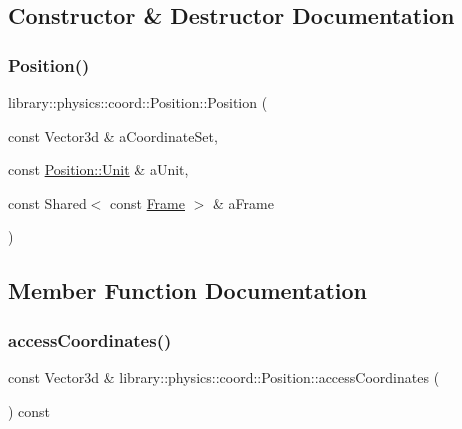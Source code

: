 \subsection{Constructor \& Destructor Documentation}
\mbox{\label{classlibrary_1_1physics_1_1coord_1_1_position_a68bead4a5057939ee5b6e77d2a8aa446}} 
\subsubsection{\texorpdfstring{Position()}{Position()}}
{\footnotesize\ttfamily library\+::physics\+::coord\+::\+Position\+::\+Position (\begin{DoxyParamCaption}\item[{const Vector3d \&}]{a\+Coordinate\+Set,  }\item[{const \hyperlink{classlibrary_1_1physics_1_1units_1_1_length_a3b8b39cd245cf6b19dc34459baeccb18}{Position\+::\+Unit} \&}]{a\+Unit,  }\item[{const Shared$<$ const \hyperlink{classlibrary_1_1physics_1_1coord_1_1_frame}{Frame} $>$ \&}]{a\+Frame }\end{DoxyParamCaption})}



\subsection{Member Function Documentation}
\mbox{\label{classlibrary_1_1physics_1_1coord_1_1_position_abbcef57299f3416b88c458ea6bcd24e5}} 
\subsubsection{\texorpdfstring{access\+Coordinates()}{accessCoordinates()}}
{\footnotesize\ttfamily const Vector3d \& library\+::physics\+::coord\+::\+Position\+::access\+Coordinates (\begin{DoxyParamCaption}{ }\end{DoxyParamCaption}) const}

